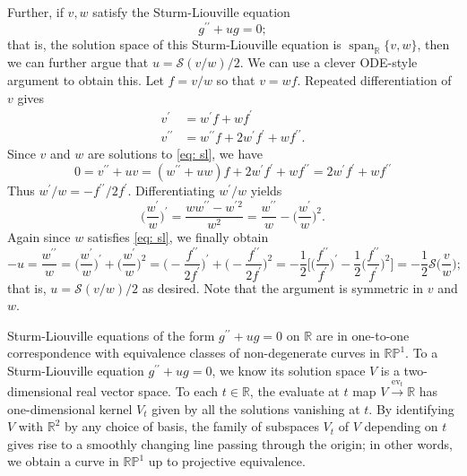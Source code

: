 \documentclass[11pt,leqno]{article}
\theoremstyle{plain}
\theoremstyle{definition}
\numberwithin{equation}{section}
\numberwithin{lem}{section}
\DeclareMathOperator{\Span}{span}
\renewcommand{\ev}{\mathrm{ev}}
\begin{document}
Further, if $v,w$ satisfy the Sturm-Liouville equation
\begin{equation}\label{eq: sl}
    g^{\prime\prime} + ug = 0;
\end{equation}
that is, the solution space of this Sturm-Liouville equation is $\Span_{\mathbb R}\{v,w\}$, then we can further argue that $u = \mathscr S(v/w)/2$. We can use a clever ODE-style argument to obtain this. Let $f = v/w$ so that $v = wf$. Repeated differentiation of $v$ gives 
\begin{align*}
    v^\prime &= w^\prime f + wf^\prime\\
    v^{\prime\prime} &= w^{\prime\prime}f + 2w^\prime f^\prime + wf^{\prime\prime}.
\end{align*}
Since $v$ and $w$ are solutions to \cref{eq: sl}, we have 
\[0 = v^{\prime\prime} + uv = (w^{\prime\prime} + uw)f + 2w^\prime f^\prime + wf^{\prime\prime} = 2w^\prime f^\prime + wf^{\prime\prime}\]
Thus $w^\prime/w = -f^{\prime\prime}/2f^\prime$. Differentiating $w^\prime/w$ yields
\[\biggl(\frac{w^\prime}{w}\biggr)^\prime = \frac{ww^{\prime\prime}-w^\prime{}^2}{w^2} = \frac{w^{\prime\prime}}{w}-\biggl(\frac{w^\prime}{w}\biggr)^2.\]
Again since $w$ satisfies \cref{eq: sl}, we finally obtain 
\[-u = \frac{w^{\prime\prime}}{w} = \biggl(\frac{w^\prime}{w}\biggr)^\prime+\biggl(\frac{w^\prime}{w}\biggr)^2 = \biggl(-\frac{f^{\prime\prime}}{2f^\prime}\biggr)^\prime+\biggl(-\frac{f^{\prime\prime}}{2f^\prime}\biggr)^2 = -\frac{1}{2}\biggl[\biggl(\frac{f^{\prime\prime}}{f^\prime}\biggr)^\prime-\frac{1}{2}\biggl(\frac{f^{\prime\prime}}{f^\prime}\biggr)^2\biggr]=-\frac{1}{2}\mathscr S\biggl(\frac{v}{w}\biggr);\] that is, $u = \mathscr S(v/w)/2$ as desired. Note that the argument is symmetric in $v$ and $w$.

Sturm-Liouville equations of the form $g^{\prime\prime} + ug = 0$ on $\mathbb R$ are in one-to-one correspondence with equivalence classes of non-degenerate curves in $\mathbb{RP}^1$. To a Sturm-Liouville equation $g^{\prime\prime} + ug = 0$, we know its solution space $V$ is a two-dimensional real vector space. To each $t\in \mathbb R$, the evaluate at $t$ map $V\xrightarrow{\ev_t} \mathbb R$ has one-dimensional kernel $V_t$ given by all the solutions vanishing at $t$. By identifying $V$ with $\mathbb R^2$ by any choice of basis, the family of subspaces $V_t$ of $V$ depending on $t$ gives rise to a smoothly changing line passing through the origin; in other words, we obtain a curve in $\mathbb{RP}^1$ up to projective equivalence.
\end{document}
